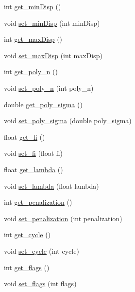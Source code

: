 \begin{DoxyCompactItemize}
int \mbox{\hyperlink{classorg_1_1opencv_1_1contrib_1_1_stereo_var_adb9b7a828ff99692e443c208d6ed7945}{get\+\_\+min\+Disp}} ()
\item 
void \mbox{\hyperlink{classorg_1_1opencv_1_1contrib_1_1_stereo_var_a0bf1a1bf416f81e8e28f10a0fb1443ba}{set\+\_\+min\+Disp}} (int min\+Disp)
\item 
int \mbox{\hyperlink{classorg_1_1opencv_1_1contrib_1_1_stereo_var_a746267e1f82ebd7106547d7b003f3dc5}{get\+\_\+max\+Disp}} ()
\item 
void \mbox{\hyperlink{classorg_1_1opencv_1_1contrib_1_1_stereo_var_a871885865b8818097bc94efd0537e6b4}{set\+\_\+max\+Disp}} (int max\+Disp)
\item 
int \mbox{\hyperlink{classorg_1_1opencv_1_1contrib_1_1_stereo_var_ad585bb666460a1f54702ae64a8a77e02}{get\+\_\+poly\+\_\+n}} ()
\item 
void \mbox{\hyperlink{classorg_1_1opencv_1_1contrib_1_1_stereo_var_a7e38a9787651074559a3975dc76d4de4}{set\+\_\+poly\+\_\+n}} (int poly\+\_\+n)
\item 
double \mbox{\hyperlink{classorg_1_1opencv_1_1contrib_1_1_stereo_var_a5d2f3b4c88975e878de46dc1909fe7fa}{get\+\_\+poly\+\_\+sigma}} ()
\item 
void \mbox{\hyperlink{classorg_1_1opencv_1_1contrib_1_1_stereo_var_adfd12ac952874f2b7d1006ed31d4d307}{set\+\_\+poly\+\_\+sigma}} (double poly\+\_\+sigma)
\item 
float \mbox{\hyperlink{classorg_1_1opencv_1_1contrib_1_1_stereo_var_ab92138338b9df7823defdb5de55a62ff}{get\+\_\+fi}} ()
\item 
void \mbox{\hyperlink{classorg_1_1opencv_1_1contrib_1_1_stereo_var_a9cb6ecf1cc5c1a414e3fc826ed54c9c5}{set\+\_\+fi}} (float fi)
\item 
float \mbox{\hyperlink{classorg_1_1opencv_1_1contrib_1_1_stereo_var_a56b71d8840b5ca145f0bcc72eedc7c86}{get\+\_\+lambda}} ()
\item 
void \mbox{\hyperlink{classorg_1_1opencv_1_1contrib_1_1_stereo_var_a86193c62d170ffb29d3b669eb5cd64d1}{set\+\_\+lambda}} (float lambda)
\item 
int \mbox{\hyperlink{classorg_1_1opencv_1_1contrib_1_1_stereo_var_aeab1f51bc8ff35102ea16189baa8d197}{get\+\_\+penalization}} ()
\item 
void \mbox{\hyperlink{classorg_1_1opencv_1_1contrib_1_1_stereo_var_a53130535d9146db42a22fae092273808}{set\+\_\+penalization}} (int penalization)
\item 
int \mbox{\hyperlink{classorg_1_1opencv_1_1contrib_1_1_stereo_var_a381756f1c40832d1e1fb7786d7aa99de}{get\+\_\+cycle}} ()
\item 
void \mbox{\hyperlink{classorg_1_1opencv_1_1contrib_1_1_stereo_var_a454ce59d7930380c2a076bec852ae066}{set\+\_\+cycle}} (int cycle)
\item 
int \mbox{\hyperlink{classorg_1_1opencv_1_1contrib_1_1_stereo_var_a12b815c6906750a2a915b06b348700bb}{get\+\_\+flags}} ()
\item 
void \mbox{\hyperlink{classorg_1_1opencv_1_1contrib_1_1_stereo_var_ade200ceccff579f4e0b472ca38a5297b}{set\+\_\+flags}} (int flags)
\end{DoxyCompactItemize}
